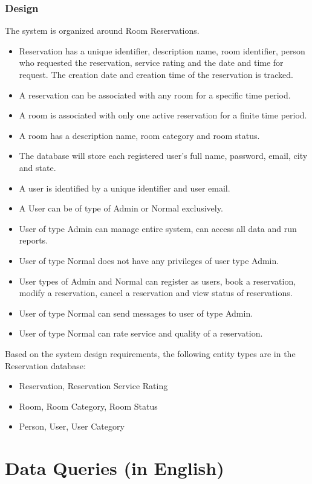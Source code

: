 \documentclass[11pt]{report}
\begin{document}
\subsubsection{Design}
The system is organized around Room Reservations. 
\begin{itemize}
\item Reservation has a unique identifier, description name, room identifier, person who requested the reservation, service rating and the date and time for request. The creation date and creation time of the reservation is tracked. \item A reservation can be associated with any room for a specific time period.
\item A room is associated with only one active reservation for a finite time period.
\item A room has a description name, room category and room status.
\item The database will store each registered user's full name, password, email, city and state.
\item A user is identified by a unique identifier and user email.
\item A User can be of type of Admin or Normal exclusively.
\item User of type Admin can manage entire system, can access all data and run reports.
\item User of type Normal does not have any privileges of user type Admin.
\item User types of Admin and Normal can register as users, book a reservation, modify a reservation, cancel a reservation and view status of reservations.
\item User of type Normal can send messages to user of type Admin.
\item User of type Normal can rate service and quality of a reservation.
\end{itemize}

Based on the system design requirements, the following entity types are in the Reservation database:
\begin{itemize}
    \item Reservation,  Reservation Service Rating
    \item Room, Room Category, Room Status
    \item Person, User, User Category
\end{itemize}

\section*{Data Queries (in English)}
\end{document}
